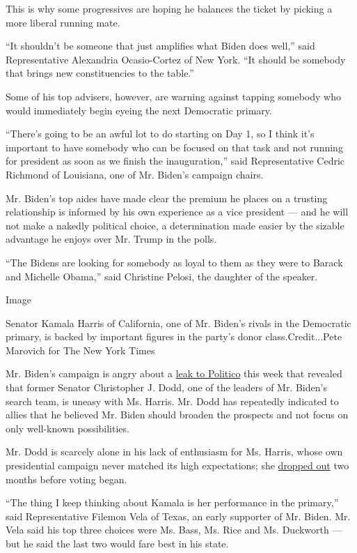 This is why some progressives are hoping he balances the ticket by
picking a more liberal running mate.

``It shouldn't be someone that just amplifies what Biden does well,''
said Representative Alexandria Ocasio-Cortez of New York. ``It should be
somebody that brings new constituencies to the table.''

Some of his top advisers, however, are warning against tapping somebody
who would immediately begin eyeing the next Democratic primary.

``There's going to be an awful lot to do starting on Day 1, so I think
it's important to have somebody who can be focused on that task and not
running for president as soon as we finish the inauguration,'' said
Representative Cedric Richmond of Louisiana, one of Mr. Biden's campaign
chairs.

Mr. Biden's top aides have made clear the premium he places on a
trusting relationship is informed by his own experience as a vice
president --- and he will not make a nakedly political choice, a
determination made easier by the sizable advantage he enjoys over Mr.
Trump in the polls.

``The Bidens are looking for somebody as loyal to them as they were to
Barack and Michelle Obama,'' said Christine Pelosi, the daughter of the
speaker.

Image

Senator Kamala Harris of California, one of Mr. Biden's rivals in the
Democratic primary, is backed by important figures in the party's donor
class.Credit...Pete Marovich for The New York Times

Mr. Biden's campaign is angry about a
\href{https://www.politico.com/news/2020/07/27/kamala-harris-biden-vp-381829}{leak
to Politico} this week that revealed that former Senator Christopher J.
Dodd, one of the leaders of Mr. Biden's search team, is uneasy with Ms.
Harris. Mr. Dodd has repeatedly indicated to allies that he believed Mr.
Biden should broaden the prospects and not focus on only well-known
possibilities.

Mr. Dodd is scarcely alone in his lack of enthusiasm for Ms. Harris,
whose own presidential campaign never matched its high expectations; she
\href{https://www.nytimes.com/2019/11/29/us/politics/kamala-harris-2020.html}{dropped
out} two months before voting began.

``The thing I keep thinking about Kamala is her performance in the
primary,'' said Representative Filemon Vela of Texas, an early supporter
of Mr. Biden. Mr. Vela said his top three choices were Ms. Bass, Ms.
Rice and Ms. Duckworth --- but he said the last two would fare best in
his state.


